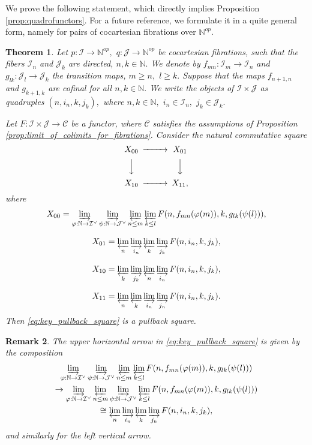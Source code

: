 \documentclass[11pt,leqno]{amsart}
\newtheorem{theo}{Theorem}[section]
\newtheorem{remark}[theo]{Remark}
\numberwithin{equation}{section}
\def\N{\mathbb{N}}
\newcommand{\indlim}[1][]{\mathop{\varinjlim}\limits_{#1}}
\newcommand{\prolim}[1][]{\mathop{\varprojlim}\limits_{#1}}
\newcommand{\cJ}{{\mathcal J}}
\newcommand{\cI}{{\mathcal I}}
\newcommand{\cC}{{\mathcal C}}
\begin{document}
We prove the following statement, which directly implies Proposition \ref{prop:quadrofunctors}. For a future reference, we formulate it in a quite general form, namely for pairs of cocartesian fibrations over $\N^{op}.$

\begin{theo}\label{th:pullback_square_quadrofunctors} Let $p:\cI\to\N^{op},$ $q:\cJ\to\N^{op}$ be cocartesian fibrations, such that the fibers $\cI_n$ and $\cJ_k$ are directed, $n,k\in\N.$ We denote by $f_{mn}:\cI_m\to\cI_n$ and $g_{lk}:\cJ_l\to\cJ_k$ the transition maps, $m\geq n,$ $l\geq k.$ Suppose that the maps $f_{n+1,n}$ and $g_{k+1,k}$ are cofinal for all $n,k\in \N.$ We write the objects of $\cI\times\cJ$ as quadruples $(n,i_n,k,j_k),$ where $n,k\in\N,$ $i_n\in\cI_n,$ $j_k\in\cJ_k.$

Let $F:\cI\times\cJ\to\cC$ be a functor, where $\cC$ satisfies the assumptions of Proposition \ref{prop:limit_of_colimits_for_fibrations}. Consider the natural commutative square
\begin{equation}
\label{eq:key_pullback_square}
\begin{CD}
	X_{00}  @>>> X_{01}\\
	@VVV @VVV\\
	X_{10} @>>> X_{11},
\end{CD}	
\end{equation}
where
\begin{equation*}
X_{00} = \indlim[\varphi:\N\to\cI^{\vee}]\indlim[\psi:\N\to\cJ^{\vee}]\prolim[n\leq m]\prolim[k\leq l] F(n,f_{mn}(\varphi(m)),k,g_{lk}(\psi(l))),
\end{equation*}

\begin{equation*}
X_{01} = \prolim[n]\indlim[i_n]\prolim[k]\indlim[j_k]F(n,i_n,k,j_k),
\end{equation*}

\begin{equation*}
X_{10} = \prolim[k]\indlim[j_k]\prolim[n]\indlim[i_n]F(n,i_n,k,j_k),
\end{equation*}

\begin{equation*}
X_{11} = \prolim[n]\prolim[k]\indlim[i_n]\indlim[j_n]F(n,i_n,k,j_k).
\end{equation*}
Then \eqref{eq:key_pullback_square} is a pullback square.
\end{theo} 

\begin{remark}
The upper horizontal arrow in \eqref{eq:key_pullback_square} is given by the composition
\begin{multline*}
\indlim[\varphi:\N\to\cI^{\vee}]\indlim[\psi:\N\to\cJ^{\vee}]\prolim[n\leq m]\prolim[k\leq l] F(n,f_{mn}(\varphi(m)),k,g_{lk}(\psi(l)))\\
\to \indlim[\varphi:\N\to\cI^{\vee}]\prolim[n\leq m]\indlim[\psi:\N\to\cJ^{\vee}]\prolim[k\leq l] F(n,f_{mn}(\varphi(m)),k,g_{lk}(\psi(l)))\\
\cong \prolim[n]\indlim[i_n]\prolim[k]\indlim[j_k]F(n,i_n,k,j_k),
\end{multline*}
and similarly for the left vertical arrow.
\end{remark}
\end{document}
